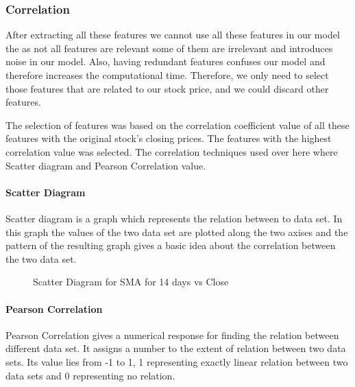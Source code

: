\documentclass[5p,,preprint,12pt,twocolumn]{elsarticle}
\makeatletter
\def\fixFloatSize#1{}%
\makeatother
\begin{document}
\subsubsection{Correlation}After extracting all these features we cannot use all these features in our model the as not all features are relevant some of them are irrelevant and introduces noise in our model. Also, having redundant features confuses our model and therefore increases the computational time. Therefore, we only need to select those features that are related to our stock price, and we could discard other features. 

The selection of features was based on the correlation coefficient value of all these features with the original stock's closing prices. The features with the highest correlation value was selected. The correlation techniques used over here where Scatter diagram and Pearson Correlation value. 



\paragraph{Scatter Diagram}Scatter diagram is a graph which represents the relation between to data set. In this graph the values of the two data set are plotted along the two axises and the pattern of the resulting graph gives a basic idea about the correlation between the two data set.


\bgroup
\fixFloatSize{images/a22461c6-231b-45aa-8c38-b0eae2e5e733-uscatter-diagram-ma14-days.png}
\begin{figure}[!htbp]
\centering \makeatletter{}
\makeatother 
\caption{{Scatter Diagram for SMA for 14 days vs Close}}
\label{f-17b8b0e26c01}
\end{figure}
\egroup




\paragraph{Pearson Correlation}Pearson Correlation gives a numerical response for finding the relation between different data set. It assigns a number to the extent of relation between two data sets. Its value lies from -1 to 1, 1 representing exactly linear relation between two data sets and 0 representing no relation.
\end{document}
